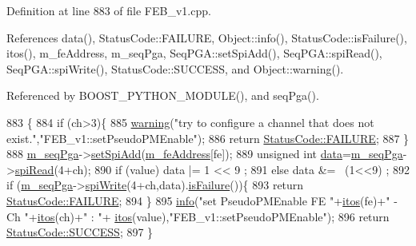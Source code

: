 Definition at line 883 of file F\+E\+B\+\_\+v1.\+cpp.



References data(), Status\+Code\+::\+F\+A\+I\+L\+U\+RE, Object\+::info(), Status\+Code\+::is\+Failure(), itos(), m\+\_\+fe\+Address, m\+\_\+seq\+Pga, Seq\+P\+G\+A\+::set\+Spi\+Add(), Seq\+P\+G\+A\+::spi\+Read(), Seq\+P\+G\+A\+::spi\+Write(), Status\+Code\+::\+S\+U\+C\+C\+E\+SS, and Object\+::warning().



Referenced by B\+O\+O\+S\+T\+\_\+\+P\+Y\+T\+H\+O\+N\+\_\+\+M\+O\+D\+U\+L\+E(), and seq\+Pga().


\begin{DoxyCode}
883                                                                 \{
884   \textcolor{keywordflow}{if} (ch>3)\{
885     \hyperlink{classObject_a65cd4fda577711660821fd2cd5a3b4c9}{warning}(\textcolor{stringliteral}{"try to configure a channel that does not exist."},\textcolor{stringliteral}{"FEB\_v1::setPseudoPMEnable"});
886     \textcolor{keywordflow}{return} \hyperlink{classStatusCode_a6f565cbeadc76d14c72f047e5e85eb4ba3da73d4c469762eb9d3c960368252b26}{StatusCode::FAILURE};
887   \}
888   \hyperlink{classFEB__v1_a6c7804ac86796f233a8393043adf2e77}{m\_seqPga}->\hyperlink{classSeqPGA_ac998ce3a6d9b5f2e88cc8393f8c1df53}{setSpiAdd}(\hyperlink{classFEB__v1_a4e1945c2d5b434125f375e9d0fc6d99f}{m\_feAddress}[fe]);
889   \textcolor{keywordtype}{unsigned} \textcolor{keywordtype}{int} \hyperlink{classFEB__v1_a6bca4320bd3bbbc32efc81097f33421a}{data}=\hyperlink{classFEB__v1_a6c7804ac86796f233a8393043adf2e77}{m\_seqPga}->\hyperlink{classSeqPGA_ab3d0e5e5d4014bc7a92588a76b8713d4}{spiRead}(4+ch);
890   \textcolor{keywordflow}{if} (value)  data |= 1 << 9 ;
891   \textcolor{keywordflow}{else}        data &= ~(1<<9) ;
892   \textcolor{keywordflow}{if} (\hyperlink{classFEB__v1_a6c7804ac86796f233a8393043adf2e77}{m\_seqPga}->\hyperlink{classSeqPGA_ad4421841ce4ce8b88ad13f63216f0743}{spiWrite}(4+ch,data).\hyperlink{classStatusCode_a5dd22dc6eb2c52fc4cabc58f6dea2eb7}{isFailure}())\{
893     \textcolor{keywordflow}{return} \hyperlink{classStatusCode_a6f565cbeadc76d14c72f047e5e85eb4ba3da73d4c469762eb9d3c960368252b26}{StatusCode::FAILURE};
894   \}
895   \hyperlink{classObject_a644fd329ea4cb85f54fa6846484b84a8}{info}(\textcolor{stringliteral}{"set PseudoPMEnable FE "}+\hyperlink{Tools_8h_af330027dbdafb9a30768b3613c553e60}{itos}(fe)+\textcolor{stringliteral}{" - Ch "}+\hyperlink{Tools_8h_af330027dbdafb9a30768b3613c553e60}{itos}(ch)+\textcolor{stringliteral}{" : "}+
      \hyperlink{Tools_8h_af330027dbdafb9a30768b3613c553e60}{itos}(value),\textcolor{stringliteral}{"FEB\_v1::setPseudoPMEnable"});
896   \textcolor{keywordflow}{return} \hyperlink{classStatusCode_a6f565cbeadc76d14c72f047e5e85eb4badd0da38d3ba0d922efd1f4619bc37ad8}{StatusCode::SUCCESS};
897 \}
\end{DoxyCode}
\mbox{\label{classFEB__v1_ae8e531b961f91ac974a75c43937acf78}} 

